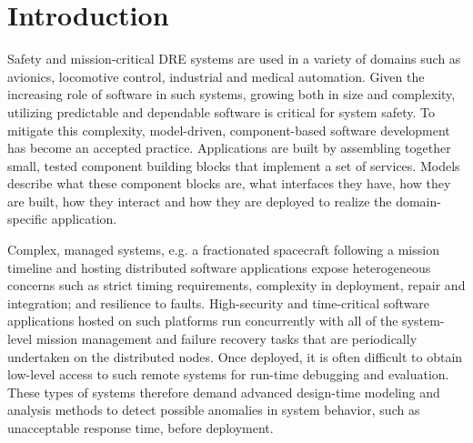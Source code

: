 \section{Introduction}
\label{sec:Introduction}

Safety and mission-critical DRE systems are used in a variety of domains such as avionics, locomotive control, industrial and medical automation. Given the increasing role of software in such systems, growing both in size and complexity, utilizing predictable and dependable software is critical for system safety. To mitigate this complexity, model-driven, component-based software development has become an accepted practice. Applications are built by assembling together small, tested component building blocks that implement a set of services. Models describe what these component blocks are, what interfaces they have, how they are built, how they interact and how they are deployed to realize the domain-specific application. 

Complex, managed systems, e.g. a fractionated spacecraft following a mission timeline and hosting distributed software applications expose heterogeneous concerns such as strict timing requirements, complexity in deployment, repair and integration; and resilience to faults. High-security and time-critical software applications hosted on such platforms run concurrently with all of the system-level mission management and failure recovery tasks that are periodically undertaken on the distributed nodes. Once deployed, it is often difficult to obtain low-level access to such remote systems for run-time debugging and evaluation. These types of systems therefore demand advanced design-time modeling and analysis methods to detect possible anomalies in system behavior, such as unacceptable response time, before deployment. 

